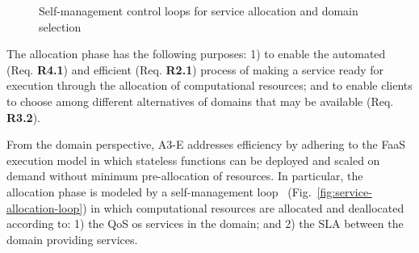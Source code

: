 \begin{figure}[tbp]
	\centering
	\captionsetup[subfigure]{width=0.4\textwidth}	
	\null\hfill
	\captionsetup[subfigure]{width=0.4\textwidth}	
	\hfill
	\hfill\null
	\caption{Self-management control loops for service allocation and domain selection}\label{fig:allocation-loops}
\end{figure}

The allocation phase has the following purposes: 1) to enable the automated (Req. \textbf{R4.1}) and efficient (Req. \textbf{R2.1}) process of making a service ready for execution through the allocation of computational resources; and to enable clients to choose among different alternatives of domains that may be available (Req. \textbf{R3.2}).


From the domain perspective, A3-E addresses efficiency by adhering to the FaaS execution model in which stateless functions can be deployed and scaled on demand without minimum pre-allocation of resources. In particular, the allocation phase is modeled by a self-management loop~\cite{kephart2003vision} (Fig.~\ref{fig:service-allocation-loop}) in which computational resources are allocated and deallocated according to: 1) the QoS os services in the domain; and 2) the SLA between the domain providing services. 

